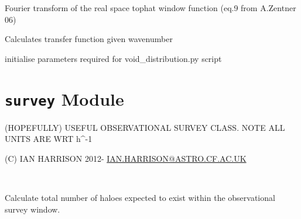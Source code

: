 \documentclass[letterpaper,10pt,english]{sphinxmanual}
\begin{document}
\begin{fulllineitems}

\begin{fulllineitems}
\label{PyCosmo:PyCosmo.powspec.PowSpec.tophat_w}
Fourier transform of the real space tophat 
window function (eq.9 from A.Zentner 06)

\end{fulllineitems}


\begin{fulllineitems}
\label{PyCosmo:PyCosmo.powspec.PowSpec.transfer_function_EH}
Calculates transfer function given wavenumber

\end{fulllineitems}


\begin{fulllineitems}
\label{PyCosmo:PyCosmo.powspec.PowSpec.vd_initialisation}
initialise parameters required for 
void\_distribution.py script

\end{fulllineitems}


\end{fulllineitems}



\section{\texttt{survey} Module}
\label{PyCosmo:module-PyCosmo.survey}\label{PyCosmo:survey-module}
(HOPEFULLY) USEFUL OBSERVATIONAL SURVEY CLASS.
NOTE ALL UNITS ARE WRT h\textasciicircum{}-1

(C) IAN HARRISON
2012-
\href{mailto:IAN.HARRISON@ASTRO.CF.AC.UK}{IAN.HARRISON@ASTRO.CF.AC.UK}

\begin{fulllineitems}
\label{PyCosmo:PyCosmo.survey.Survey}~

\begin{fulllineitems}
\label{PyCosmo:PyCosmo.survey.Survey.N_in_survey}
Calculate total number of haloes expected to exist within the
observational survey window.

\end{fulllineitems}


\end{fulllineitems}
\end{document}
